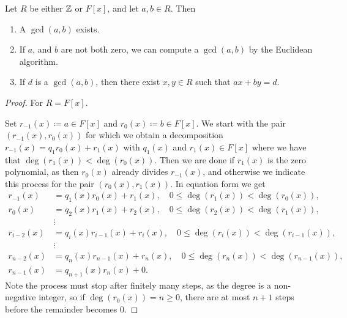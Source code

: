 \documentclass[10pt, a4paper]{article}
\begin{document}
\begin{theorem}\label{prep:algII:thm:gcdexistsinfield}
    Let $R$ be either $\mathbb{Z}$ or $F[x]$,
    and let $a, b \in R$.
    Then
    \begin{enumerate}[label = \roman*)]
        \item A $\gcd(a, b)$ exists.

        \item If $a$,
        and $b$ are not both zero,
        we can compute a $\gcd(a, b)$ by the Euclidean algorithm.

        \item If $d$ is a $\gcd(a, b)$,
        then there exist $x, y \in R$ such that $ax + by = d$.
    \end{enumerate}

    \begin{proof}
        For $R = F[x]$.

        Set $r_{-1}(x) \coloneqq a \in F[x]$ and $r_0(x) \coloneqq b \in F[x]$.
        We start with the pair $(r_{-1}(x), r_0(x))$ for which we obtain a decomposition $r_{-1}(x) = q_1r_0(x) + r_1(x)$ with $q_1(x)$ and $r_1(x) \in F[x]$ where we have that $\deg(r_1(x)) < \deg(r_0(x))$.
        Then we are done if $r_1(x)$ is the zero polynomial,
        as then $r_0(x)$ already divides $r_{-1}(x)$,
        and otherwise we indicate this process for the pair $(r_0(x), r_1(x))$.
        In equation form we get
        \begin{align*}
            r_{-1}(x) &= q_1(x)r_0(x) + r_1(x),\quad 0 \leq \deg(r_1(x)) < \deg(r_0(x)), \\
            r_{0}(x) &= q_2(x)r_1(x) + r_2(x),\quad 0 \leq \deg(r_2(x)) < \deg(r_1(x)), \\
            &\vdots \\
            r_{i - 2}(x) &= q_i(x)r_{i - 1}(x) + r_i(x),\quad 0 \leq \deg(r_i(x)) < \deg(r_{i - 1}(x)), \\
            &\vdots \\
            r_{n - 2}(x) &= q_n(x)r_{n - 1}(x) + r_n(x),\quad 0 \leq \deg(r_n(x)) < \deg(r_{n - 1}(x)), \\
            r_{n - 1}(x) &= q_{n + 1}(x)r_{n}(x) + 0.
        \end{align*}
        Note the process must stop after finitely many steps,
        as the degree is a non-negative integer,
        so if $\deg(r_0(x)) = n \geq 0$,
        there are at most $n + 1$ steps before the remainder becomes $0$.


\end{proof}
\end{theorem}
\end{document}
